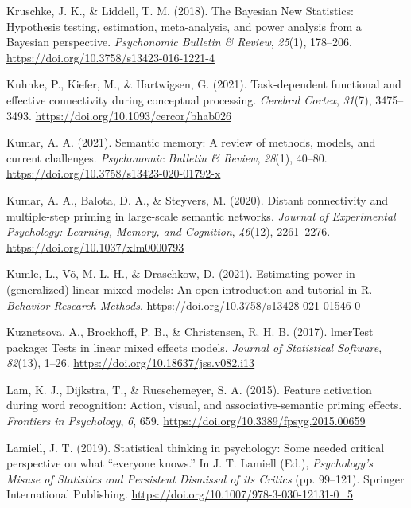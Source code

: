 \documentclass[
  12pt,
  man,floatsintext]{apa7}
\newlength{\cslhangindent}
\newlength{\cslentryspacingunit} %
\newenvironment{CSLReferences}[2] %
 {%
  \setlength{\parindent}{0pt}
  \ifodd #1
  \let\oldpar\par
  \def\par{\hangindent=\cslhangindent\oldpar}
  \fi
  \setlength{\parskip}{#2\cslentryspacingunit}
 }%
 {}
\begin{document}
\begin{CSLReferences}{1}{0}
\leavevmode{}%
Kruschke, J. K., \& Liddell, T. M. (2018). The {Bayesian New Statistics}: {Hypothesis} testing, estimation, meta-analysis, and power analysis from a {Bayesian} perspective. \emph{Psychonomic Bulletin \& Review}, \emph{25}(1), 178--206. \url{https://doi.org/10.3758/s13423-016-1221-4}

\leavevmode{}%
Kuhnke, P., Kiefer, M., \& Hartwigsen, G. (2021). Task-dependent functional and effective connectivity during conceptual processing. \emph{Cerebral Cortex}, \emph{31}(7), 3475--3493. \url{https://doi.org/10.1093/cercor/bhab026}

\leavevmode{}%
Kumar, A. A. (2021). Semantic memory: {A} review of methods, models, and current challenges. \emph{Psychonomic Bulletin \& Review}, \emph{28}(1), 40--80. \url{https://doi.org/10.3758/s13423-020-01792-x}

\leavevmode{}%
Kumar, A. A., Balota, D. A., \& Steyvers, M. (2020). Distant connectivity and multiple-step priming in large-scale semantic networks. \emph{Journal of Experimental Psychology: Learning, Memory, and Cognition}, \emph{46}(12), 2261--2276. \url{https://doi.org/10.1037/xlm0000793}

\leavevmode{}%
Kumle, L., Võ, M. L.-H., \& Draschkow, D. (2021). Estimating power in (generalized) linear mixed models: {An} open introduction and tutorial in {R}. \emph{Behavior Research Methods}. \url{https://doi.org/10.3758/s13428-021-01546-0}

\leavevmode{}%
Kuznetsova, A., Brockhoff, P. B., \& Christensen, R. H. B. (2017). {lmerTest} package: Tests in linear mixed effects models. \emph{Journal of Statistical Software}, \emph{82}(13), 1--26. \url{https://doi.org/10.18637/jss.v082.i13}

\leavevmode{}%
Lam, K. J., Dijkstra, T., \& Rueschemeyer, S. A. (2015). Feature activation during word recognition: Action, visual, and associative-semantic priming effects. \emph{Frontiers in Psychology}, \emph{6}, 659. \url{https://doi.org/10.3389/fpsyg.2015.00659}

\leavevmode{}%
Lamiell, J. T. (2019). Statistical thinking in psychology: Some needed critical perspective on what {``everyone knows.''} In J. T. Lamiell (Ed.), \emph{Psychology's {Misuse} of {Statistics} and {Persistent Dismissal} of its {Critics}} (pp. 99--121). {Springer International Publishing}. \url{https://doi.org/10.1007/978-3-030-12131-0_5}


\end{CSLReferences}
\end{document}
